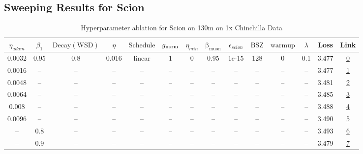\subsection{Sweeping Results for Scion}%
\begin{table}[H]
\centering
\caption{Hyperparameter ablation for Scion on 130m on 1x Chinchilla Data}
\label{tab:ablation_scion_130m_on_1x_chinchilla_data}
\begin{tabular}{cccccccccccccc}
\toprule
$\eta_{adam}$ & $\beta_1$ & $\mathrm{Decay (WSD)}$ & $\eta$ & $\mathrm{Schedule}$ & $g_{\mathrm{norm}}$ & $\eta_{min}$ & $\mathrm{\beta_{muon}}$ & $\epsilon_{scion}$ & $\mathrm{BSZ}$ & $\mathrm{warmup}$ & $\lambda$ & Loss & Link \\
\midrule
0.0032 & 0.95 & 0.8 & 0.016 & linear & 1 & 0 & 0.95 & 1e-15 & 128 & 0 & 0.1 & 3.477 & \href{https://wandb.ai/marin-community/optimizer-scaling/runs/sweep-130m-2B-scion88e825lr0.016-wd0.1-minlr0-warmup0-b10.95-gn1-09a932}{0} \\
\midrule
0.0016 & -- & -- & -- & -- & -- & -- & -- & -- & -- & -- & -- & 3.477 & \href{https://wandb.ai/marin-community/optimizer-scaling/runs/sweep-130m-2B-scion840d88lr0.016-wd0.1-minlr0-warmup0-b10.95-gn1-61f5f7}{1} \\
0.0048 & -- & -- & -- & -- & -- & -- & -- & -- & -- & -- & -- & 3.481 & \href{https://wandb.ai/marin-community/optimizer-scaling/runs/sweep-130m-2B-scion8e26felr0.016-wd0.1-minlr0-warmup0-b10.95-gn1-382d16}{2} \\
0.0064 & -- & -- & -- & -- & -- & -- & -- & -- & -- & -- & -- & 3.485 & \href{https://wandb.ai/marin-community/optimizer-scaling/runs/sweep-130m-2B-scionf020a1lr0.016-wd0.1-minlr0-warmup0-b10.95-gn1-f5cf5d}{3} \\
0.008 & -- & -- & -- & -- & -- & -- & -- & -- & -- & -- & -- & 3.488 & \href{https://wandb.ai/marin-community/optimizer-scaling/runs/sweep-130m-2B-sciona0879alr0.016-wd0.1-minlr0-warmup0-b10.95-gn1-99b18a}{4} \\
0.0096 & -- & -- & -- & -- & -- & -- & -- & -- & -- & -- & -- & 3.490 & \href{https://wandb.ai/marin-community/optimizer-scaling/runs/sweep-130m-2B-scion4bb4a4lr0.016-wd0.1-minlr0-warmup0-b10.95-gn1-e076fe}{5} \\
-- & 0.8 & -- & -- & -- & -- & -- & -- & -- & -- & -- & -- & 3.493 & \href{https://wandb.ai/marin-community/optimizer-scaling/runs/sweep-130m-2B-scion76ae21lr0.016-wd0.1-minlr0-warmup0-b10.8-gn1--382a96}{6} \\
-- & 0.9 & -- & -- & -- & -- & -- & -- & -- & -- & -- & -- & 3.479 & \href{https://wandb.ai/marin-community/optimizer-scaling/runs/sweep-130m-2B-scione9cd68lr0.016-wd0.1-minlr0-warmup0-b10.9-gn1--16327d}{7} \\

\end{tabular}
\end{table}
